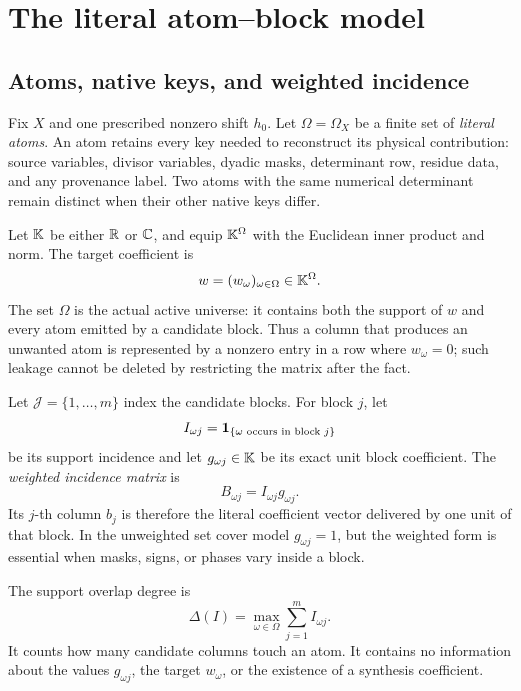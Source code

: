\section{The literal atom--block model}
\label{sec:literal-model}

\subsection{Atoms, native keys, and weighted incidence}

Fix \(X\) and one prescribed nonzero shift \(h_0\).  Let
\(\Omega=\Omega_X\) be a finite set of \emph{literal atoms}.  An atom
retains every key needed to reconstruct its physical contribution:
source variables, divisor variables, dyadic masks, determinant row,
residue data, and any provenance label.  Two atoms with the same
numerical determinant remain distinct when their other native keys
differ.

Let \(\mathbb K\) be either \(\mathbb R\) or \(\mathbb C\), and equip
\(\mathbb K^\Omega\) with the Euclidean inner product and norm.  The target
coefficient is
\[
 w=(w_\omega)_{\omega\in\Omega}\in\mathbb K^\Omega.
\]
The set \(\Omega\) is the actual active universe: it contains both the
support of \(w\) and every atom emitted by a candidate block.  Thus a
column that produces an unwanted atom is represented by a nonzero
entry in a row where \(w_\omega=0\); such leakage cannot be deleted
by restricting the matrix after the fact.

Let \(\mathcal J=\{1,\dots,m\}\) index the candidate blocks.  For
block \(j\), let
\[
 I_{\omega j}=\mathbf 1_{\{\omega\text{ occurs in block }j\}}
\]
be its support incidence and let \(g_{\omega j}\in\mathbb K\) be its exact
unit block coefficient.  The \emph{weighted incidence matrix} is
\begin{equation}
 B_{\omega j}=I_{\omega j}g_{\omega j}.
 \label{eq:weighted-incidence}
\end{equation}
Its \(j\)-th column \(b_j\) is therefore the literal coefficient
vector delivered by one unit of that block.  In the unweighted set
cover model \(g_{\omega j}=1\), but the weighted form is essential
when masks, signs, or phases vary inside a block.

\begin{definition}
\label{def:overlap-degree}
The support overlap degree is
\[
 \Delta(I)=\max_{\omega\in\Omega}
 \sum_{j=1}^m I_{\omega j}.
\]
It counts how many candidate columns touch an atom.  It contains no
information about the values \(g_{\omega j}\), the target \(w_\omega\),
or the existence of a synthesis coefficient.
\end{definition}

